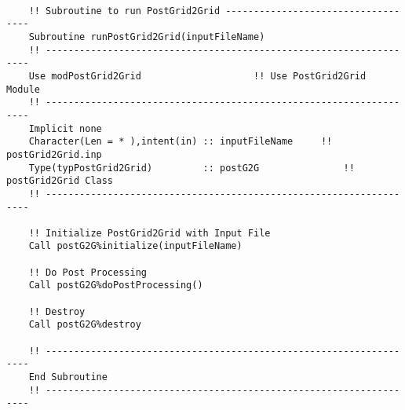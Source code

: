 	\vspace{0.5cm}
	
	\begin{lstlisting}[language={[95]Fortran}]	

	!! Subroutine to run PostGrid2Grid -----------------------------------
	Subroutine runPostGrid2Grid(inputFileName)
	!! -------------------------------------------------------------------
	Use modPostGrid2Grid					!! Use PostGrid2Grid Module
	!! -------------------------------------------------------------------
	Implicit none	
	Character(Len = * ),intent(in) :: inputFileName		!! postGrid2Grid.inp	
	Type(typPostGrid2Grid)         :: postG2G				!! postGrid2Grid Class
	!! -------------------------------------------------------------------	
	
	!! Initialize PostGrid2Grid with Input File	
	Call postG2G%initialize(inputFileName)
	
	!! Do Post Processing
	Call postG2G%doPostProcessing()
	
	!! Destroy
	Call postG2G%destroy
	
	!! -------------------------------------------------------------------
	End Subroutine
	!! -------------------------------------------------------------------	
	\end{lstlisting}